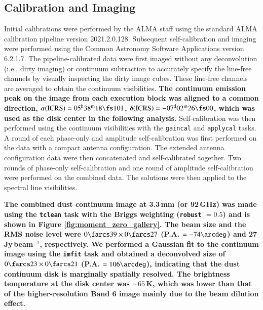 \documentclass[linenumbers, twocolumn, twocolappendix, astrosymb, times]{aastex631}
\begin{document}
\subsection{Calibration and Imaging}
Initial calibrations were performed by the ALMA staff using the standard ALMA calibration pipeline version 2021.2.0.128. Subsequent self-calibration and imaging were performed using the Common Astronomy Software Applications \citep[CASA;][]{CASA} version 6.2.1.7. The pipeline-calibrated data were first imaged without any deconvolution (i.e., dirty imaging) or continuum subtraction to accurately specify the line-free channels by visually inspecting the dirty image cubes. These line-free channels are averaged to obtain the continuum visibilities. \textbf{The continuum emission peak on the image from each execution block was aligned to a common direction, $\alpha\mathrm{(ICRS)}= 05^\mathrm{h}38^\mathrm{m}18\fs101$, $\delta\mathrm{(ICRS)} = -07^\mathrm{d}02^\mathrm{m}26\fs00$,
which was used as the disk center in the following analysis.} Self-calibration was then performed using the continuum visibilities with the \texttt{gaincal} and \texttt{applycal} tasks. A round of each phase-only and amplitude self-calibration was first performed on the data with a compact antenna configuration. The extended antenna configuration data were then concatenated and self-calibrated together. Two rounds of phase-only self-calibration and one round of amplitude self-calibration were performed on the combined data. The solutions were then applied to the spectral line visibilities.

\textbf{The combined dust continuum image at 3.3\,mm (or 92\,GHz) was made using the \texttt{tclean} task with the Briggs weighting (\texttt{robust} $=0.5$) and is shown in Figure \ref{fig:moment_zero_gallery}. The beam size and the RMS noise level were $0\farcs39\times0\farcs27$ (P.A. $= -74\arcdeg$) and 27\,\textmu Jy\,beam$^{-1}$, respectively. We performed a Gaussian fit to the continuum image using the \texttt{imfit} task and obtained a deconvolved size of $0\farcs23\times0\farcs21$ (P.A. $= 106\arcdeg$), indicating that the dust continuum disk is marginally spatially resolved. The brightness temperature at the disk center was $\sim65$\,K, which was lower than that of the higher-resolution Band 6 image \citep{Cieza2016} mainly due to the beam dilution effect.}
\end{document}
